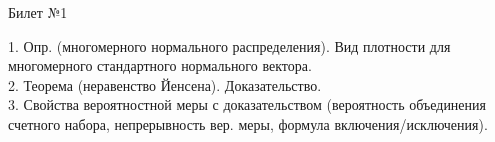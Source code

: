\documentclass[preview]{standalone}
\begin{document}
 
\begin{center} {\Large Билет №1} \end{center} 

1.  Опр. (многомерного нормального распределения). Вид плотности для многомерного стандартного нормального вектора. \\

2.  Теорема (неравенство Йенсена). Доказательство.\\

3.  Свойства  вероятностной меры с доказательством (вероятность объединения счетного набора, непрерывность вер. меры, формула включения/исключения).\\
\end{document}
